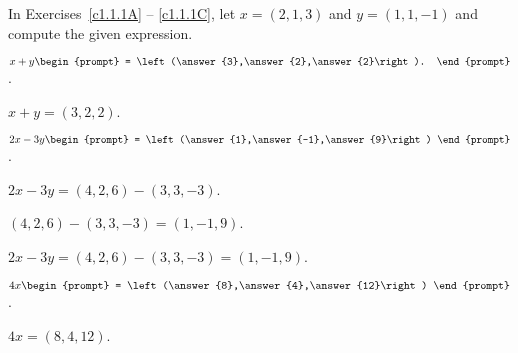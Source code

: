 \documentclass{ximera}
\begin{document}
\noindent In Exercises~\ref{c1.1.1A} -- \ref{c1.1.1C}, let $x=(2,1,3)$ and 
$y=(1,1,-1)$ and compute the given expression.
\begin{exercise}  \label{c1.1.1A}
  $x+y\begin{prompt}
    = \left(\answer{3},\answer{2},\answer{2}\right).
  \end{prompt}$.

\begin{solution}
$ x + y = (3,2,2)$.

\end{solution}
\end{exercise}
\begin{exercise}  \label{c1.1.1B}
  $2x-3y\begin{prompt}
    = \left(\answer{1},\answer{-1},\answer{9}\right)
  \end{prompt}$.
  \begin{hint}
    $2x - 3y = (4,2,6) - (3,3,-3)$.
  \end{hint}
  \begin{hint}
    $(4,2,6) - (3,3,-3) = (1,-1,9)$.
  \end{hint}  

\begin{solution}
$2x - 3y = (4,2,6) - (3,3,-3) = (1,-1,9)$.

\end{solution}
\end{exercise}

\begin{exercise}  \label{c1.1.1C}
  $4x\begin{prompt}
    = \left(\answer{8},\answer{4},\answer{12}\right)
    \end{prompt}$.

\begin{solution}
$4x = (8,4,12)$.
\end{solution}
\end{exercise}
\end{document}
